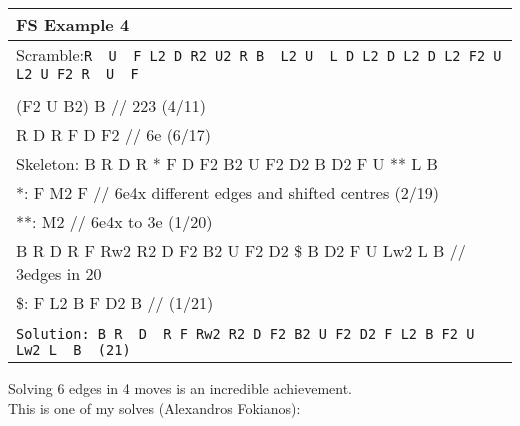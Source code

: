 \documentclass[11pt,a4paper]{book}
\newcommand{\p}{\textquotesingle}
\newcommand{\m}{\texttt}
\newcommand{\ps}{\p\,\,}
\newcommand{\comment}[1]{{\color{gray}\quad//#1}}
\begin{document}
\bigskip
\begin{tabular}{|l|}
\hline
\textbf{FS Example 4}\\
\hline
Scramble:\m{R\ps U\ps F L2 D R2 U2 R B\ps L2 U\ps L D L2 D L2 D L2 F2 U L2 U F2 R\ps U\ps F}\\
\hline
\begin{minipage}[l]{0.650\textwidth}
\bigskip
\m{(B L\ps U F D2 B\ps D2)  \comment{ 123 block (7/7)}\\
(F2 U\ps B2) B  \comment{ 223 (4/11)}\\
R\ps D\ps R F D F2  \comment{ 6e (6/17)}\\
\newline
Skeleton: B R\ps D\ps R * F D F2 B2 U F2 D2 B D2 F\ps U\ps ** L B\ps  \\
*: F M2 F\ps  \comment{ 6e4x different edges and shifted centres (2/19)}\\
**: M2  \comment{ 6e4x to 3e (1/20) }\\
B R\ps D\ps R F Rw2 R2 D F2 B2 U F2 D2 \$ B D2 F\ps U\ps Lw2 L\ps B\ps  \comment{ 3edges in 20}\\
\$: F L2 B F\ps D2 B\ps  \comment{ (1/21) }\\
}
\bigskip
\end{minipage}
\begin{minipage}[c]{0.25\textwidth}
\centering
\def\svgwidth{\columnwidth}

\end{minipage}\\
\hline
\m{Solution: B R\ps D\ps R F Rw2 R2 D F2 B2 U F2 D2 F L2 B F2 U\ps Lw2 L\ps B\ps (21)}\\
\hline
\end{tabular}
\bigskip
\newline
Solving 6 edges in 4 moves is an incredible achievement.\\
\newline
This is one of my solves (Alexandros Fokianos):\\
\end{document}
